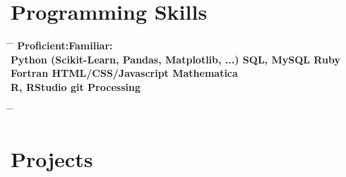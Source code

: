 \documentclass[10pt]{article} %
\begin{document}
\section{Programming Skills}
\parbox{0.5\textwidth}{ %
\begin{tabbing}
\hspace{3cm} \= \hspace{4cm} \= \kill
\bf{Proficient:\hspace{59mm}Familiar:} \\
\sqbullet\hspace{3mm}Python (Scikit-Learn, Pandas, Matplotlib, ...)  \hspace{3.7mm}\sqbullet\hspace{3mm}SQL, MySQL        \hspace{20mm}\sqbullet\hspace{3mm}Ruby\\
\sqbullet\hspace{3mm}Fortran                             \hspace{58.3mm}\sqbullet\hspace{3mm}HTML/CSS/Javascript \hspace{5.6mm}\sqbullet\hspace{3mm}Mathematica\\
\sqbullet\hspace{3mm}R, RStudio                          \hspace{53.9mm}\sqbullet\hspace{3mm}git                 \hspace{35mm}\sqbullet\hspace{3mm}Processing
\end{tabbing}}
\hfill %
\parbox{0.5\textwidth}{ %
\begin{tabbing}
\hspace{3cm} \= \hspace{4cm} \= \kill
\bf{}
\end{tabbing}}



\section{Projects}
\end{document}
